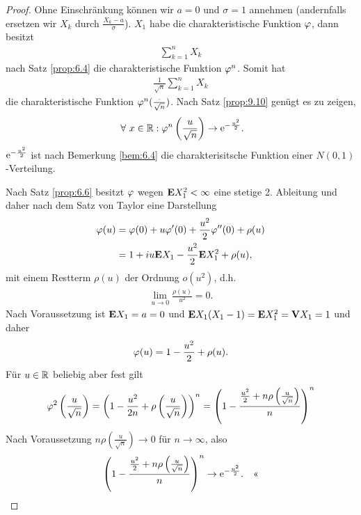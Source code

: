 \begin{proof}
Ohne Einschränkung können wir $a=0$ und $\sigma=1$ annehmen (andernfalls
ersetzen wir $X_k$ durch $\frac{X_k-a}{\sigma}$). $X_1$ habe die
charakteristische Funktion $\varphi$, dann besitzt
\begin{align*}
\sum\limits_{k=1}^n X_k
\end{align*}
nach Satz \ref{prop:6.4} die charakteristische Funktion $\varphi^n$. Somit hat
\begin{align*}
\frac{1}{\sqrt{n}}\sum\limits_{k=1}^n X_k
\end{align*}
die charakteristische Funktion $\varphi^n(\frac{\cdot}{\sqrt{n}})$.
Nach Satz \ref{prop:9.10} genügt es zu zeigen,
\begin{align*}
\forall x\in\R : \ph^n\left(\frac{u}{\sqrt{n}}\right)\to \e^{-\frac{u^2}{2}}.
\end{align*}
$\mathrm{e}^{-\frac{u^2}{2}}$ ist nach Bemerkung \ref{bem:6.4} die charakterisitsche
Funktion einer $N(0,1)$-Verteilung.

Nach Satz \ref{prop:6.6} besitzt $\varphi$ wegen $\textbf{E} X_1^2 < \infty$ eine stetige
2. Ableitung und daher nach dem Satz von Taylor eine Darstellung
\begin{align*}
\varphi(u) &= \varphi(0) + u\varphi'(0) + \frac{u^2}{2}\varphi''(0) + \rho(u)\\ 
&= 1 + iu\textbf{E} X_1 - \frac{u^2}{2}\textbf{E} X_1^2 + \rho(u),
\end{align*}
mit einem Restterm $\rho(u)$ der Ordnung $o(u^2)$, d.h.
\begin{align*}
\lim\limits_{u\to 0}\frac{\rho(u)}{u^2} = 0.
\end{align*}
Nach Voraussetzung ist $\textbf{E} X_1 = a = 0$ und $\textbf{E} X_1(X_1-1)
= \textbf{E} X_1^2 = \textbf{V} X_1 = 1$ und daher
\begin{align*}
\varphi(u) =  1 - \frac{u^2}{2} + \rho(u).
\end{align*}
Für $u\in\mathbb{R}$ beliebig aber fest gilt
\begin{align*}
\varphi^2\left(\frac{u}{\sqrt{n}}\right) =
\left(1 - \frac{u^2}{2n} + \rho\left(\frac{u}{\sqrt{n}}\right)\right)^n
=  \left(1 - \frac{\frac{u^2}{2} +
n\rho\left(\frac{u}{\sqrt{n}}\right)}{n}\right)^n
\end{align*} 
Nach Voraussetzung $n\rho\left(\frac{u}{\sqrt{n}}\right)\to 0$ für
$n\to\infty$, also
\begin{align*}
\left(1 - \frac{\frac{u^2}{2} +
n\rho\left(\frac{u}{\sqrt{n}}\right)}{n}\right)^n \to
\mathrm{e}^{-\frac{u^2}{2}}.\quad\text{<<}
\end{align*}
\end{proof}

